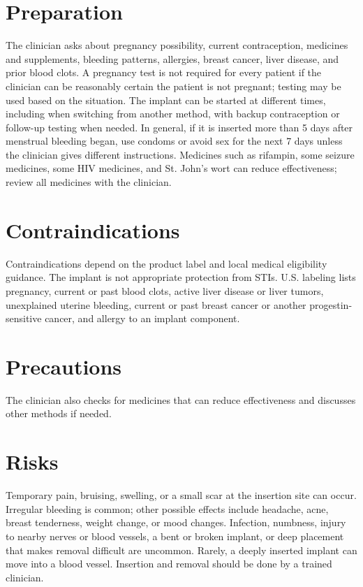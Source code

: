 \section*{Preparation}
The clinician asks about pregnancy possibility, current contraception, medicines and supplements, bleeding patterns, allergies, breast cancer, liver disease, and prior blood clots. A pregnancy test is not required for every patient if the clinician can be reasonably certain the patient is not pregnant; testing may be used based on the situation. The implant can be started at different times, including when switching from another method, with backup contraception or follow-up testing when needed. In general, if it is inserted more than 5 days after menstrual bleeding began, use condoms or avoid sex for the next 7 days unless the clinician gives different instructions. Medicines such as rifampin, some seizure medicines, some HIV medicines, and St. John's wort can reduce effectiveness; review all medicines with the clinician.

\section*{Contraindications}
Contraindications depend on the product label and local medical eligibility guidance. The implant is not appropriate protection from STIs. U.S. labeling lists pregnancy, current or past blood clots, active liver disease or liver tumors, unexplained uterine bleeding, current or past breast cancer or another progestin-sensitive cancer, and allergy to an implant component.

\section*{Precautions}
The clinician also checks for medicines that can reduce effectiveness and discusses other methods if needed.

\section*{Risks}
Temporary pain, bruising, swelling, or a small scar at the insertion site can occur. Irregular bleeding is common; other possible effects include headache, acne, breast tenderness, weight change, or mood changes. Infection, numbness, injury to nearby nerves or blood vessels, a bent or broken implant, or deep placement that makes removal difficult are uncommon. Rarely, a deeply inserted implant can move into a blood vessel. Insertion and removal should be done by a trained clinician.

